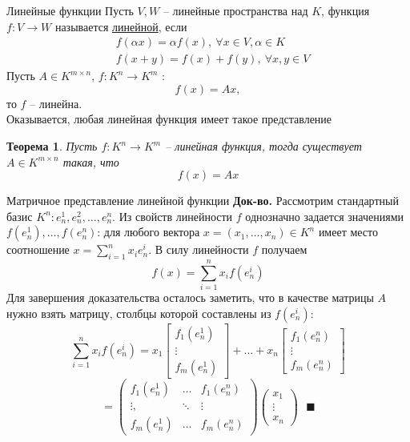 \documentclass[10pt, handout]{beamer}
\newcounter{thm}
\newtheorem{theorem_ru}[thm]{Теорема}
\begin{document}
\begin{frame}{Линейные функции}
Пусть $V, W$ -- линейные пространства над $K$, функция $f:V\rightarrow W$ называется \underline{линейной}, если 
\begin{align*}
&f(\alpha x)=\alpha f(x),~\forall x\in V, \alpha\in K\\
&f(x+y)=f(x)+f(y),~\forall x,y\in V
\end{align*}
\pause
Пусть $A\in K^{m\times n}$, $f:K^n\rightarrow K^m$ :
$$
f(x)=Ax,
$$
то $f$ -- линейна. \\
\pause
Оказывается, любая линейная функция имеет такое представление
\begin{theorem_ru}
Пусть $f:K^n\rightarrow K^m$ -- линейная функция, тогда существует $A\in K^{m\times n}$ такая, что 
$$
f(x)=Ax
$$
\end{theorem_ru}

\end{frame}

\begin{frame}{Матричное представление линейной функции}
\textbf{Док-во.} Рассмотрим стандартный базис $K^n: e^1_n, e_n^2, \ldots, e_n^n$. Из свойств линейности $f$ однозначно задается значениями $f(e^1_n),\ldots, f(e^n_n)$: для любого вектора $x=(x_1, \ldots, x_n)\in K^n$ имеет место соотношение $x=\sum_{i=1}^nx_ie_n^i$. В силу линейности $f$ получаем
$$
f(x)=\sum_{i=1}^nx_if(e^i_n)
$$
\pause
Для завершения доказательства осталось заметить, что в качестве матрицы $A$ нужно взять матрицу, столбцы которой составлены из $f(e^i_n)$:
$$
\sum_{i=1}^nx_if(e^i_n)=x_1\left[
\begin{array}{c}
f_1(e_n^1)\\
\vdots\\
f_m(e_n^1)
\end{array}
\right]+
\ldots + x_n \left[
\begin{array}{c}
f_1(e_n^n)\\
\vdots\\
f_m(e_n^n)
\end{array}
\right]
$$
$$
=\left(\begin{array}{ccc}
f_1(e_n^1) & \ldots & f_1(e_n^n)\\
\vdots, & \ddots & \vdots \\
f_m(e_n^1) & \ldots & f_m(e_n^n)
\end{array}
\right)
\left(
\begin{array}{c}
x_1\\ \vdots \\ x_n
\end{array}
\right)~~~\blacksquare
$$

\end{frame}
\end{document}
